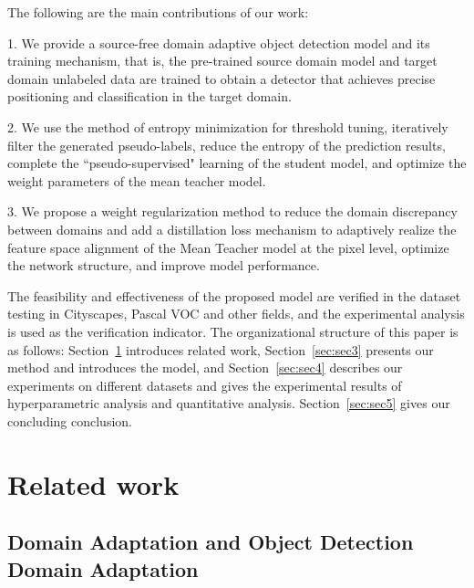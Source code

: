 \documentclass[sn-mathphys]{sn-jnl}%
\theoremstyle{thmstyleone}%
\theoremstyle{thmstyletwo}%
\theoremstyle{thmstylethree}%
\begin{document}
The following are the main contributions of our work:

1. We provide a source-free domain adaptive object detection model and its training mechanism, that is, the pre-trained source domain model and target domain unlabeled data are trained to obtain a detector that achieves precise positioning and classification in the target domain.

2. We use the method of entropy minimization for threshold tuning, iteratively filter the generated pseudo-labels, reduce the entropy of the prediction results, complete the ``pseudo-supervised" learning of the student model, and optimize the weight parameters of the mean teacher model.

3. We propose a weight regularization method to reduce the domain discrepancy between domains and add a distillation loss mechanism to adaptively realize the feature space alignment of the Mean Teacher model at the pixel level, optimize the network structure, and improve model performance.  

The feasibility and effectiveness of the proposed model are verified in the dataset testing in Cityscapes, Pascal VOC and other fields, and the experimental analysis is used as the verification indicator. The organizational structure of this paper is as follows: Section~\ref{sec:sec2} introduces related work, Section~\ref{sec:sec3} presents our method and introduces the model, and Section~\ref{sec:sec4} describes our experiments on different datasets and gives the experimental results of hyperparametric analysis and quantitative analysis. Section~\ref{sec:sec5} gives our concluding conclusion.


%
%

\section{Related work}\label{sec:sec2}

\subsection{Domain Adaptation and Object Detection Domain Adaptation}
\end{document}
